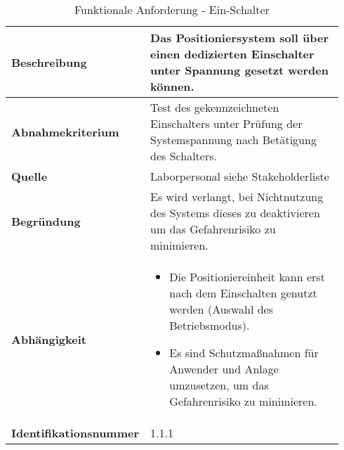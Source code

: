 \documentclass[../../../Bachelorarbeit.tex]{subfiles}
\begin{document}
\begin{table}[H]
    \centering
    \begin{tabular}{| p{0.34\linewidth} | p{0.6\linewidth} |}
        \hline
        \textbf{Beschreibung} & Das Positioniersystem soll über einen dedizierten Einschalter unter Spannung gesetzt werden können. \\ \hline
        \textbf{Abnahmekriterium} & Test des gekennzeichneten Einschalters unter Prüfung der Systemspannung nach Betätigung des Schalters. \\ \hline
        \textbf{Quelle} & Laborpersonal siehe Stakeholderliste \\ \hline
        \textbf{Begründung} & Es wird verlangt, bei Nichtnutzung des Systems dieses zu deaktivieren um das Gefahrenrisiko zu minimieren. \\ \hline
        \textbf{Abhängigkeit} & {\begin{itemize}[noitemsep,topsep=0pt,parsep=0pt,partopsep=0pt,leftmargin=*]
                                    \item Die Positioniereinheit kann erst nach dem Einschalten genutzt werden (Auswahl des Betriebsmodus).
                                    \item Es sind Schutzmaßnahmen für Anwender und Anlage umzusetzen, um das Gefahrenrisiko zu minimieren.
                                \end{itemize}} \\ \hline
        \textbf{Identifikationsnummer} & 1.1.1 \\ \hline
    \end{tabular}
    \caption[\acs{fa} - EIN-Schalter]{Funktionale Anforderung - Ein-Schalter}
    \label{tab:my-table}
\end{table}
\end{document}
